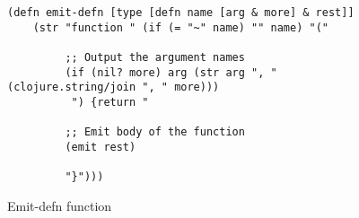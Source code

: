 \begin{figure}[ht]
\centering
\begin{verbatim}
(defn emit-defn [type [defn name [arg & more] & rest]]
    (str "function " (if (= "~" name) "" name) "("
     
         ;; Output the argument names 
         (if (nil? more) arg (str arg ", " (clojure.string/join ", " more)))
          ") {return "
        
         ;; Emit body of the function
         (emit rest)

         "}")))
\end{verbatim}
\caption{Emit-defn function}
\label{fig:emit-defn}
\end{figure}
